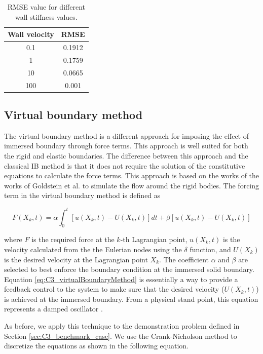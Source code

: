 \begin{table}[H]
\centering
\begin{tabular}{c | c}
	 Wall velocity & RMSE \\ \hline \hline
	 0.1 & 0.1912 \\ \hline
	 1 & 0.1759  \\ \hline
	 10 & 0.0665 \\ \hline
	 100 & 0.001 \\
\end{tabular}
\caption{RMSE value for different wall stiffness values.}
\label{table:C3_classicalIBResultWallStiffnessRMSE}
\end{table}

\subsection{Virtual boundary method}
The virtual boundary method is a different approach for imposing the effect of immersed boundary through force terms. This approach is well suited for both the rigid and elastic boundaries. The difference between this approach and the classical IB method is that it does not require the solution of the constitutive equations to calculate the force terms. This approach is based on the works of the works of Goldstein et al. \cite{goldstein1993modeling} to simulate the flow around the rigid bodies. The forcing term in the virtual boundary method is defined as

\begin{equation}\label{eq:C3_virtualBoundaryMethod}
	F(X_k, t) = 
	\alpha \int_0^t \left[ u(X_k, t) - U(X_k, t) \right] dt + 
	\beta \left[ u(X_k, t) - U(X_k, t) \right]
\end{equation}

where $F$ is the required force at the $k$-th Lagrangian point, $u(X_k, t)$ is the velocity calculated from the the Eulerian nodes using the $\delta$ function, and $U(X_k)$ is the desired velocity at the Lagrangian point $X_k$. The coefficient $\alpha$ and $\beta$ are selected to best enforce the boundary condition at the immersed solid boundary. Equation \eqref{eq:C3_virtualBoundaryMethod} is essentially a way to provide a feedback control to the system to make sure that the desired velocity ($U(X_k, t)$) is achieved at the immersed boundary. From a physical stand point, this equation represents a damped oscillator \cite{iaccarino2003immersed}.

As before, we apply this technique to the demonstration problem defined in Section \ref{sec:C3_benchmark_case}. We use the Crank-Nicholson method to discretize the equations as shown in the following equation. 

